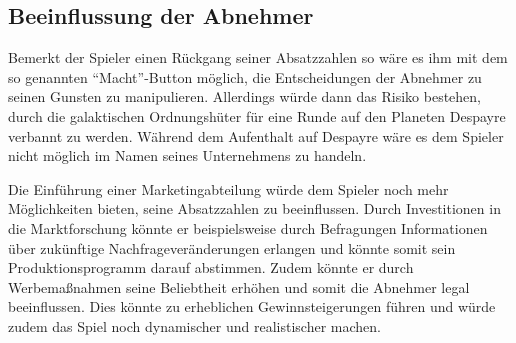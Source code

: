 \subsection{Beeinflussung der Abnehmer}
\label{sec:fazit-spielverlauf-beeinflussung}

Bemerkt der Spieler einen Rückgang seiner Absatzzahlen so wäre es ihm mit dem so genannten “Macht”-Button möglich, die Entscheidungen der Abnehmer zu seinen Gunsten zu manipulieren. Allerdings würde dann das Risiko bestehen, durch die galaktischen Ordnungshüter für eine Runde auf den Planeten Despayre verbannt zu werden. Während dem Aufenthalt auf Despayre wäre es dem Spieler nicht möglich im Namen seines Unternehmens zu handeln. 

Die Einführung einer Marketingabteilung würde dem Spieler noch mehr Möglichkeiten bieten, seine Absatzzahlen zu beeinflussen. Durch Investitionen in die Marktforschung könnte er beispielsweise durch Befragungen Informationen über zukünftige Nachfrageveränderungen erlangen und könnte somit sein Produktionsprogramm darauf abstimmen. Zudem könnte er durch Werbemaßnahmen seine Beliebtheit erhöhen und somit die Abnehmer legal beeinflussen. Dies könnte zu erheblichen Gewinnsteigerungen führen und würde zudem das Spiel noch dynamischer und realistischer machen.